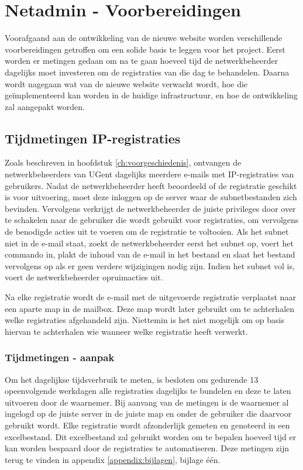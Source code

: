 
\chapter{Netadmin - Voorbereidingen}%
\label{ch:netadmin-voorbereidingen}

Voorafgaand aan de ontwikkeling van de nieuwe website worden verschillende voorbereidingen getroffen om een solide basis te leggen voor het project. Eerst worden er metingen gedaan om na te gaan hoeveel tijd de netwerkbeheerder dagelijks moet investeren om de registraties van die dag te behandelen. Daarna wordt nagegaan wat van de nieuwe website verwacht wordt, hoe die geïmplementeerd kan worden in de huidige infrastructuur, en hoe de ontwikkeling zal aangepakt worden.

\section{Tijdmetingen IP-registraties}
Zoals beschreven in hoofdstuk \ref{ch:voorgeschiedenis}, ontvangen de netwerkbeheerders van UGent dagelijks meerdere e-mails met IP-registraties van gebruikers. Nadat de netwerkbeheerder heeft beoordeeld of de registratie geschikt is voor uitvoering, moet deze inloggen op de server waar de subnetbestanden zich bevinden. Vervolgens verkrijgt de netwerkbeheerder de juiste privileges door over te schakelen naar de gebruiker die wordt gebruikt voor registraties, om vervolgens de benodigde acties uit te voeren om de registratie te voltooien. Als het subnet niet in de e-mail staat, zoekt de netwerkbeheerder eerst het subnet op, voert het commando in, plakt de inhoud van de e-mail in het bestand en slaat het bestand vervolgens op als er geen verdere wijzigingen nodig zijn. Indien het subnet vol is, voert de netwerkbeheerder opruimacties uit.

Na elke registratie wordt de e-mail met de uitgevoerde registratie verplaatst naar een aparte map in de mailbox. Deze map wordt later gebruikt om te achterhalen welke registraties afgehandeld zijn. Niettemin is het niet mogelijk om op basis hiervan te achterhalen wie wanneer welke registratie heeft verwerkt.

\subsection{Tijdmetingen - aanpak}
Om het dagelijkse tijdsverbruik te meten, is besloten om gedurende 13 opeenvolgende werkdagen alle registraties dagelijks te bundelen en deze te laten uitvoeren door de waarnemer. Bij aanvang van de metingen is de waarnemer al ingelogd op de juiste server in de juiste map en onder de gebruiker die daarvoor gebruikt wordt. Elke registratie wordt afzonderlijk gemeten en genoteerd in een excelbestand. Dit excelbestand zal gebruikt worden om te bepalen hoeveel tijd er kan worden bespaard door de registraties te automatiseren. Deze metingen zijn terug te vinden in appendix \ref{appendix:bijlagen}, bijlage één.

